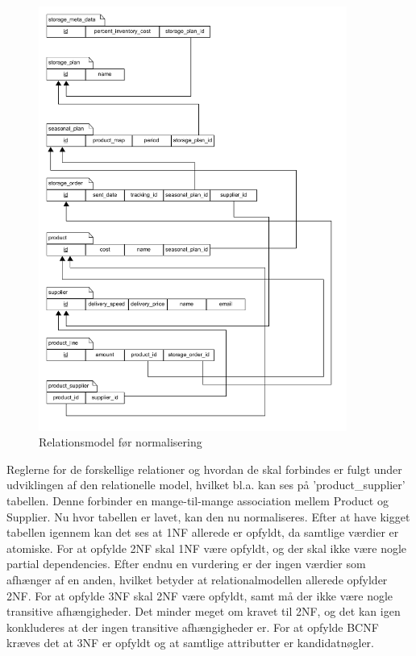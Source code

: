 \begin{figure}[H]
    \centering
    \includegraphics[width=0.9\textwidth]{figures/krav/relation_model_0th_normalization.png}
    \caption{Relationsmodel før normalisering}
    \label{fig:relational_model_0}
\end{figure}

Reglerne for de forskellige relationer og hvordan de skal forbindes er fulgt under udviklingen af den relationelle model, hvilket bl.a. kan ses på 'product_supplier' tabellen. Denne forbinder en mange-til-mange association mellem Product og Supplier. 
Nu hvor tabellen er lavet, kan den nu normaliseres.
Efter at have kigget tabellen igennem kan det ses at 1NF allerede er opfyldt, da samtlige værdier er atomiske.
For at opfylde 2NF skal 1NF være opfyldt, og der skal ikke være nogle partial dependencies. Efter endnu en vurdering er der ingen værdier som afhænger af en anden, hvilket betyder at relationalmodellen allerede opfylder 2NF.
For at opfylde 3NF skal 2NF være opfyldt, samt må der ikke være nogle transitive afhængigheder. Det minder meget om kravet til 2NF, og det kan igen konkluderes at der ingen transitive afhængigheder er.
For at opfylde BCNF kræves det at 3NF er opfyldt og at samtlige attributter er kandidatnøgler.


